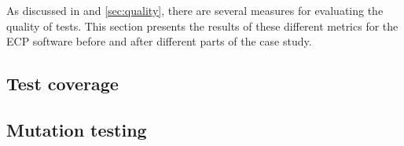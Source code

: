 
\label{sec:results_quality}

As discussed in  and \ref{sec:quality}, there are
several measures for evaluating the quality of tests. This section
presents the results of these different metrics for the ECP software
before and after different parts of the case study.\\


\subsection{Test coverage}
    

\subsection{Mutation testing}
    
